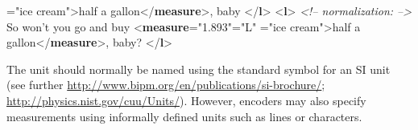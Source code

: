 \begin{reflist}
\begin{shaded}
{\hspace*{1em}\hspace*{1em}{commodity}="{ice cream}">}half\mbox{}\newline 
\hspace*{1em}\hspace*{1em} a gallon{</\textbf{measure}>}, baby\mbox{}\newline 
{</\textbf{l}>}\mbox{}\newline 
{<\textbf{l}>}\mbox{}\newline 
\textit{<!-- normalization: -->}\mbox{}\newline 
 So won't you go and buy {<\textbf{measure}\hspace*{1em}{quantity}="{1.893}"\hspace*{1em}{unit}="{L}"\mbox{}\newline 
\hspace*{1em}\hspace*{1em}{commodity}="{ice cream}">}half\mbox{}\newline 
\hspace*{1em}\hspace*{1em} a gallon{</\textbf{measure}>}, baby?\mbox{}\newline 
{</\textbf{l}>}\end{shaded}\egroup\par \noindent    \par
The unit should normally be named using the standard symbol for an SI unit (see further \url{http://www.bipm.org/en/publications/si-brochure/}; \url{http://physics.nist.gov/cuu/Units/}). However, encoders may also specify measurements using informally defined units such as lines or characters.
\end{reflist}  
